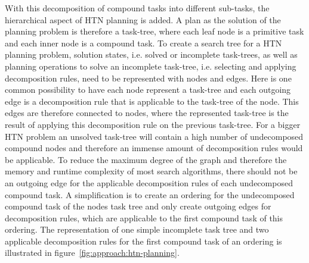 With this decomposition of compound tasks into different sub-tasks, the hierarchical aspect of HTN planning is added.
A plan as the solution of the planning problem is therefore a task-tree, where each leaf node is a primitive task and each inner node is a compound task.
To create a search tree for a HTN planning problem, solution states, i.e. solved or incomplete task-trees, as well as planning operations to solve an incomplete task-tree, i.e. selecting and applying decomposition rules, need to be represented with nodes and edges.\newline
Here is one common possibility to have each node represent a task-tree and each outgoing edge is a decomposition rule that is applicable to the task-tree of the node.
This edges are therefore connected to nodes, where the represented task-tree is the result of applying this decomposition rule on the previous task-tree.
For a bigger HTN problem an unsolved task-tree will contain a high number of undecomposed compound nodes and therefore an immense amount of decomposition rules would be applicable.
To reduce the maximum degree of the graph and therefore the memory and runtime complexity of most search algorithms, there should not be an outgoing edge for the applicable decomposition rules of each undecomposed compound task.
A simplification is to create an ordering for the undecomposed compound task of the nodes task tree and only create outgoing edges for decomposition rules, which are applicable to the first compound task of this ordering.
The representation of one simple incomplete task tree and two applicable decomposition rules for the first compound task of an ordering is illustrated in figure~\ref{fig:approach:htn-planning}.
